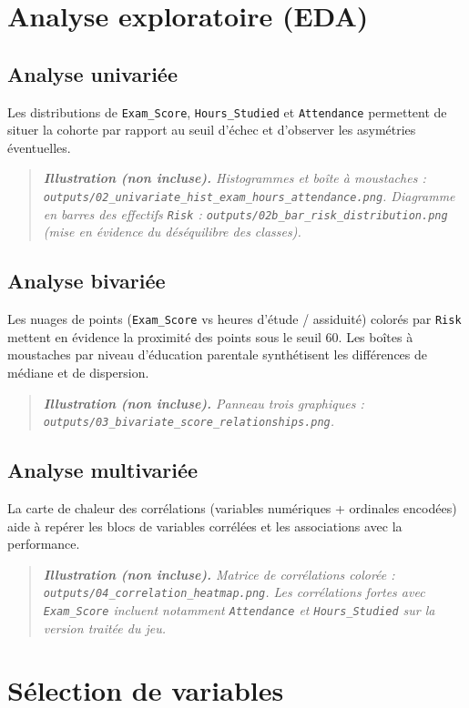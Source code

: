 \documentclass[a4paper,11pt]{article}
\newcommand{\notevisuel}[1]{%
  \begin{quote}\small\itshape
  \textbf{Illustration (non incluse).} #1
  \end{quote}
}
\begin{document}
\section{Analyse exploratoire (EDA)}

\subsection{Analyse univariée}
Les distributions de \texttt{Exam\_Score}, \texttt{Hours\_Studied} et \texttt{Attendance} permettent de situer la cohorte par rapport au seuil d'échec et d'observer les asymétries éventuelles.

\notevisuel{Histogrammes et boîte à moustaches : \texttt{outputs/02\_univariate\_hist\_exam\_hours\_attendance.png}. Diagramme en barres des effectifs \texttt{Risk} : \texttt{outputs/02b\_bar\_risk\_distribution.png} (mise en évidence du déséquilibre des classes).}

\subsection{Analyse bivariée}
Les nuages de points (\texttt{Exam\_Score} vs heures d'étude / assiduité) colorés par \texttt{Risk} mettent en évidence la proximité des points sous le seuil 60. Les boîtes à moustaches par niveau d'éducation parentale synthétisent les différences de médiane et de dispersion.

\notevisuel{Panneau trois graphiques : \texttt{outputs/03\_bivariate\_score\_relationships.png}.}

\subsection{Analyse multivariée}
La carte de chaleur des corrélations (variables numériques + ordinales encodées) aide à repérer les blocs de variables corrélées et les associations avec la performance.

\notevisuel{Matrice de corrélations colorée : \texttt{outputs/04\_correlation\_heatmap.png}. Les corrélations fortes avec \texttt{Exam\_Score} incluent notamment \texttt{Attendance} et \texttt{Hours\_Studied} sur la version traitée du jeu.}

\section{Sélection de variables}
\end{document}
